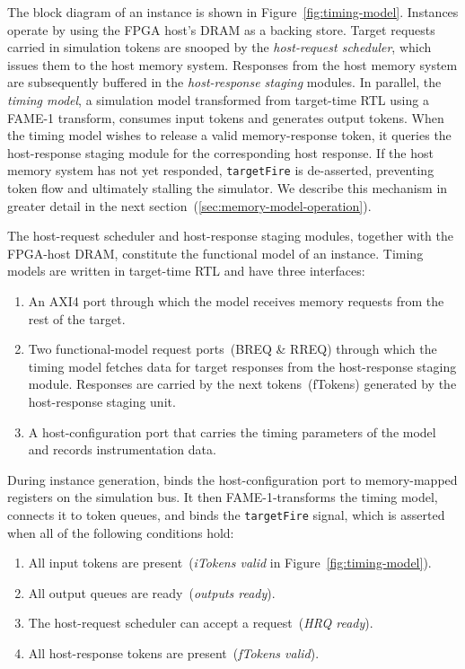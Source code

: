 The block diagram of an instance is shown in Figure~\ref{fig:timing-model}.
Instances operate by using the FPGA host's DRAM as a backing store.  Target
requests carried in simulation tokens are snooped by the \emph{host-request
scheduler}, which issues them to the host memory system.  Responses from the
host memory system are subsequently buffered in the \emph{host-response
staging} modules. In parallel, the \emph{timing model}, a simulation model
transformed from target-time RTL using a FAME-1 transform, consumes input
tokens and generates output tokens. When the timing model wishes to release a
valid memory-response token, it queries the host-response staging module for
the corresponding host response. If the host memory system has not yet responded,
\texttt{targetFire} is de-asserted, preventing token flow and
ultimately stalling the simulator. We describe this mechanism in greater detail in
the next section~(\ref{sec:memory-model-operation}).

The host-request scheduler and host-response staging modules, together with the
FPGA-host DRAM, constitute the functional model of an instance.  Timing models
are written in target-time RTL and have three interfaces:

\begin{enumerate}
    \item An AXI4 port through which the model receives memory requests from the rest of the target.
    \item Two functional-model request ports~(BREQ \& RREQ) through which the
        timing model fetches data for target responses from the host-response
        staging module. Responses are carried by the next tokens~(fTokens)
        generated by the host-response staging unit.
    \item A host-configuration port that carries the timing parameters of the
        model and records instrumentation data.
\end{enumerate}

During instance generation, \PNAME binds the host-configuration port to memory-mapped
registers on the simulation bus. It then FAME-1-transforms the timing model, connects it to
token queues, and binds the \texttt{targetFire} signal, which is asserted when all of the following
conditions hold:

\begin{enumerate}
    \item All input tokens are present~(\textit{iTokens valid} in Figure~\ref{fig:timing-model}).
    \item All output queues are ready~(\textit{outputs ready}).
    \item The host-request scheduler can accept a request~(\textit{HRQ ready}).
    \item All host-response tokens are present~(\textit{fTokens valid}).
\end{enumerate}

